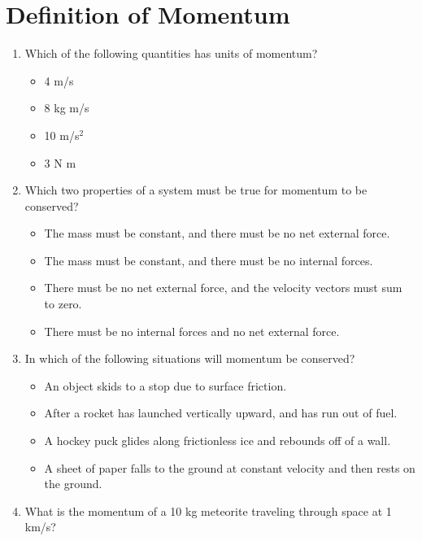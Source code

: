 \documentclass[10pt]{article}
\begin{document}
\maketitle

\section{Definition of Momentum}
\begin{enumerate}
\item Which of the following quantities has units of momentum?
\begin{itemize}
\item 4 m/s
\item 8 kg m/s
\item 10 m/s$^2$
\item 3 N m
\end{itemize}
\item Which two properties of a system must be true for momentum to be conserved?
\begin{itemize}
\item The mass must be constant, and there must be no net external force.
\item The mass must be constant, and there must be no internal forces.
\item There must be no net external force, and the velocity vectors must sum to zero.
\item There must be no internal forces and no net external force.
\end{itemize}
\item In which of the following situations will momentum be conserved?
\begin{itemize}
\item An object skids to a stop due to surface friction.
\item After a rocket has launched vertically upward, and has run out of fuel.
\item A hockey puck glides along frictionless ice and rebounds off of a wall.
\item A sheet of paper falls to the ground at constant velocity and then rests on the ground.
\end{itemize}
\item What is the momentum of a 10 kg meteorite traveling through space at 1 km/s? \\ \vspace{1cm}
\end{enumerate}
\end{document}
